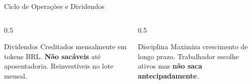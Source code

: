 \documentclass{libs/ufc_format}
\begin{document}
\begin{frame}{Ciclo de Operações e Dividendos}
    \begin{columns}
        \begin{column}{0.5\textwidth}
            \begin{exampleblock}{\small Dividendos}
                {\scriptsize Creditados mensalmente em tokens BRL. \textbf{Não sacáveis} até aposentadoria. Reinvestíveis no lote mensal.}
            \end{exampleblock}
        \end{column}
        \begin{column}{0.5\textwidth}
            \begin{alertblock}{\small Disciplina}
                {\scriptsize Maximiza crescimento de longo prazo. Trabalhador escolhe ativos mas \textbf{não saca antecipadamente}.}
            \end{alertblock}
        \end{column}
    \end{columns}
\end{frame}

\end{document}
